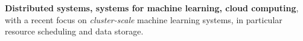 

\vspace{2mm}
\textbf{Distributed systems, systems for machine learning, cloud computing},
with a recent focus on \textit{cluster-scale} machine learning systems, in particular resource scheduling and data storage.


\vspace{2mm}